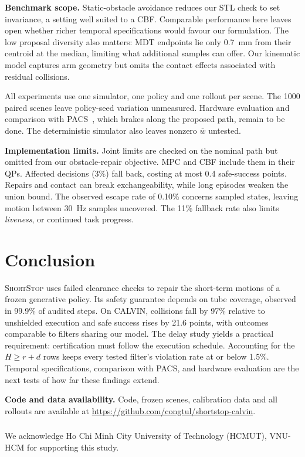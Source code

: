 \documentclass[runningheads]{llncs}
\newcommand{\sys}{\textsc{ShortStop}}
\begin{document}
\textbf{Benchmark scope.} Static-obstacle avoidance reduces our STL check
to set invariance, a setting well suited to a CBF. Comparable performance
here leaves open whether richer temporal specifications would favour our
formulation. The low proposal diversity also matters: MDT endpoints lie
only 0.7~mm from their centroid at the median, limiting what additional
samples can offer. Our kinematic model captures arm geometry but omits
the contact effects associated with residual collisions.

All experiments use one simulator, one policy and one rollout per scene.
The 1000 paired scenes leave policy-seed variation unmeasured. Hardware
evaluation and comparison with PACS~\cite{roemer2026pacs}, which brakes
along the proposed path, remain to be done. The deterministic
simulator also leaves nonzero $\bar w$ untested.

\textbf{Implementation limits.} Joint limits are checked on the nominal
path but omitted from our obstacle-repair objective. MPC and CBF include
them in their QPs. Affected decisions (3\%) fall back, costing at most
0.4 safe-success points. Repairs and contact can break exchangeability, while long episodes weaken
the union bound. The observed escape rate of 0.10\% concerns sampled
states, leaving motion between 30~Hz samples uncovered. The 11\% fallback
rate also limits \emph{liveness}, or continued task progress.

\section{Conclusion}
\sys{} uses failed clearance checks to repair the short-term motions
of a frozen generative policy. Its safety guarantee depends on tube
coverage, observed in 99.9\% of audited steps. On CALVIN, collisions fall
by 97\% relative to unshielded execution and safe success rises by
21.6 points, with outcomes comparable to filters sharing our model.
The delay study yields a practical requirement: certification must follow
the execution schedule. Accounting for the $H\ge r+d$ rows keeps every
tested filter's violation rate at or below 1.5\%. Temporal specifications,
comparison with PACS, and hardware evaluation are the next tests of how
far these findings extend.

\textbf{Code and data availability.} Code, frozen scenes, calibration data
and all rollouts are available at \url{https://github.com/congtul/shortstop-calvin}.

\begin{credits}
\subsubsection{\ackname}
We acknowledge Ho Chi Minh City University of Technology (HCMUT), VNU-HCM
for supporting this study.
\end{credits}



\end{document}
